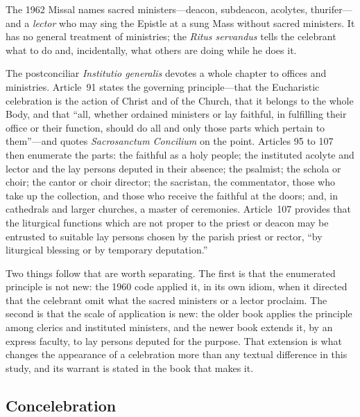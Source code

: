 The 1962 Missal names sacred ministers---deacon, subdeacon, acolytes, thurifer---and a \emph{lector} who may sing the Epistle at a sung Mass without sacred ministers. It has no general treatment of ministries; the \emph{Ritus servandus} tells the celebrant what to do and, incidentally, what others are doing while he does it.

The postconciliar \emph{Institutio generalis} devotes a whole chapter to offices and ministries. Article~91 states the governing principle---that the Eucharistic celebration is the action of Christ and of the Church, that it belongs to the whole Body, and that ``all, whether ordained ministers or lay faithful, in fulfilling their office or their function, should do all and only those parts which pertain to them''---and quotes \emph{Sacrosanctum Concilium} on the point. Articles 95 to 107 then enumerate the parts: the faithful as a holy people; the instituted acolyte and lector and the lay persons deputed in their absence; the psalmist; the schola or choir; the cantor or choir director; the sacristan, the commentator, those who take up the collection, and those who receive the faithful at the doors; and, in cathedrals and larger churches, a master of ceremonies. Article~107 provides that the liturgical functions which are not proper to the priest or deacon may be entrusted to suitable lay persons chosen by the parish priest or rector, ``by liturgical blessing or by temporary deputation.''

Two things follow that are worth separating. The first is that the enumerated principle is not new: the 1960 code applied it, in its own idiom, when it directed that the celebrant omit what the sacred ministers or a lector proclaim. The second is that the scale of application is new: the older book applies the principle among clerics and instituted ministers, and the newer book extends it, by an express faculty, to lay persons deputed for the purpose. That extension is what changes the appearance of a celebration more than any textual difference in this study, and its warrant is stated in the book that makes it.

\subsection{Concelebration}

